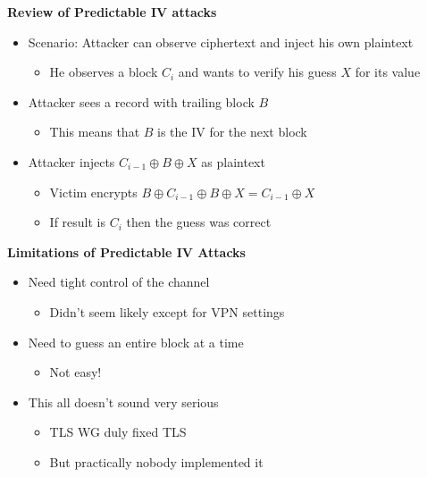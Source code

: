 \documentclass[helvetica]{seminar}
\newcommand{\heading}[1]{%
  \begin{center} 
    \large\bf 
    #1 
  \end{center} 
  \vspace{.4 in}}
\begin{document}
\begin{slide}
\heading{Review of Predictable IV attacks}

\begin{itemize}

\item Scenario: Attacker can observe ciphertext and inject his own plaintext
  \begin{itemize}
  \item He observes a block $C_i$ and wants to verify his guess $X$ for its value
  \end{itemize}

\item Attacker sees a record with trailing block $B$
  \begin{itemize}
  \item This means that $B$ is the IV for the next block
  \end{itemize}

\item Attacker injects $C_{i-1} \oplus B \oplus X$ as plaintext
  \begin{itemize}
  \item Victim encrypts $B \oplus C_{i-1} \oplus B \oplus X = C_{i-1} \oplus X$
  \item If result is $C_i$ then the guess was correct
  \end{itemize}
\end{itemize}

\end{slide}



\begin{slide}
\heading{Limitations of Predictable IV Attacks}

\begin{itemize}
\item Need tight control of the channel
  \begin{itemize}
  \item Didn't seem likely except for VPN settings
  \end{itemize}

\item Need to guess an entire block at a time
  \begin{itemize}
  \item Not easy!
  \end{itemize}

\item This all doesn't sound very serious
  \begin{itemize}
  \item TLS WG duly fixed TLS~\cite{rfc4346}
  \item But practically nobody implemented it
  \end{itemize}
\end{itemize}

\end{slide}
\end{document}
